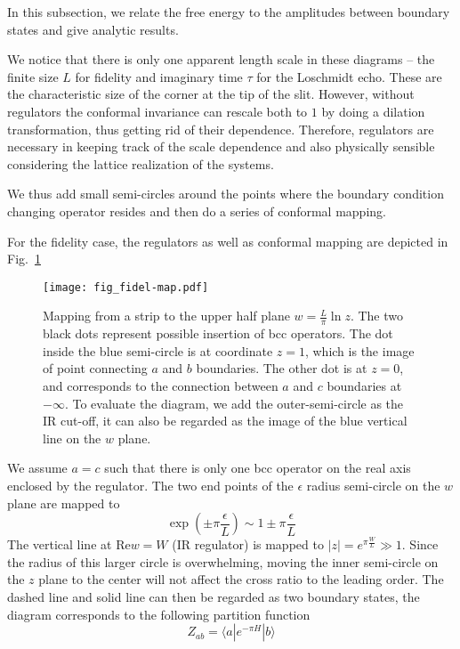 
In this subsection, we relate the free energy to the amplitudes between boundary states and give analytic results. 

We notice that there is only one apparent length scale in these diagrams -- the finite size $L$ for fidelity and imaginary time $\tau$ for the Loschmidt echo. These are the characteristic size of the corner at the tip of the slit. However, without regulators the conformal invariance can rescale both to $1$ by doing a dilation transformation, thus getting rid of their dependence. Therefore, regulators are necessary in keeping track of the scale dependence and also physically sensible considering the lattice realization of the systems. 

We thus add small semi-circles around the points where the boundary condition changing operator resides and then do a series of conformal mapping. 

For the fidelity case, the regulators as well as conformal mapping are depicted in Fig.~\ref{fig:fidel-map} 
\begin{figure}[h]
\centering
\texttt{[image: fig\_fidel-map.pdf]}
\caption{Mapping from a strip to the upper half plane $w = \frac{L}{\pi} \ln z $. The two black dots represent possible insertion of bcc operators. The dot inside the blue semi-circle is at coordinate $z = 1$, which is the image of point connecting $a$ and $b$ boundaries. The other dot is at $z = 0$, and corresponds to the connection between $a$ and $c$ boundaries at $- \infty$. To evaluate the diagram, we add the outer-semi-circle as the IR cut-off, it can also be regarded as the image of the blue vertical line on the $w$ plane.}
\label{fig:fidel-map}
\end{figure}
We assume $a = c$ such that there is only one bcc operator on the real axis enclosed by the regulator. The two end points of the $\epsilon$ radius semi-circle on the $w$ plane are mapped to
\begin{equation}
\exp( \pm \pi \frac{\epsilon}{ L}  ) \sim 1 \pm \pi \frac{\epsilon}{L} 
\end{equation}
The vertical line at $\text{Re} w = W$ (IR regulator) is mapped to $|z| = e^{\pi \frac{W}{L} } \gg 1 $. Since the radius of this larger circle is overwhelming, moving the inner semi-circle on the $z$ plane to the center will not affect the cross ratio to the leading order. The dashed line and solid line can then be regarded as two boundary states, the diagram corresponds to the following partition function
\begin{equation}
  Z_{ab} = \langle a | e^{-\pi H } |b \rangle 
\end{equation}




